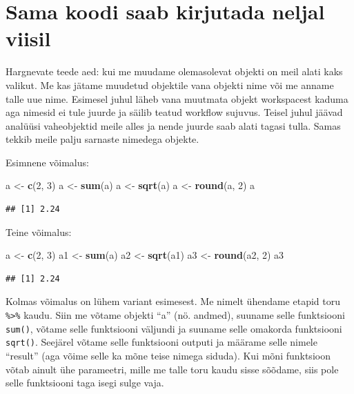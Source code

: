 \documentclass[]{book}
\newenvironment{Shaded}{\begin{snugshade}}{\end{snugshade}}
\newcommand{\KeywordTok}[1]{\textcolor[rgb]{0.13,0.29,0.53}{\textbf{#1}}}
\newcommand{\DecValTok}[1]{\textcolor[rgb]{0.00,0.00,0.81}{#1}}
\newcommand{\StringTok}[1]{\textcolor[rgb]{0.31,0.60,0.02}{#1}}
\newcommand{\NormalTok}[1]{#1}
\begin{document}
\section{Sama koodi saab kirjutada neljal
viisil}\label{sama-koodi-saab-kirjutada-neljal-viisil}

Hargnevate teede aed: kui me muudame olemasolevat objekti on meil alati
kaks valikut. Me kas jätame muudetud objektile vana objekti nime või me
anname talle uue nime. Esimesel juhul läheb vana muutmata objekt
workspacest kaduma aga nimesid ei tule juurde ja säilib teatud workflow
sujuvus. Teisel juhul jäävad analüüsi vaheobjektid meile alles ja nende
juurde saab alati tagasi tulla. Samas tekkib meile palju sarnaste
nimedega objekte.

Esimnene võimalus:

\begin{Shaded}
\begin{Highlighting}[]
\NormalTok{a <-}\StringTok{ }\KeywordTok{c}\NormalTok{(}\DecValTok{2}\NormalTok{, }\DecValTok{3}\NormalTok{)}
\NormalTok{a <-}\StringTok{ }\KeywordTok{sum}\NormalTok{(a)}
\NormalTok{a <-}\StringTok{ }\KeywordTok{sqrt}\NormalTok{(a)}
\NormalTok{a <-}\StringTok{ }\KeywordTok{round}\NormalTok{(a, }\DecValTok{2}\NormalTok{)}
\NormalTok{a}
\end{Highlighting}
\end{Shaded}

\begin{verbatim}
## [1] 2.24
\end{verbatim}

Teine võimalus:

\begin{Shaded}
\begin{Highlighting}[]
\NormalTok{a <-}\StringTok{ }\KeywordTok{c}\NormalTok{(}\DecValTok{2}\NormalTok{, }\DecValTok{3}\NormalTok{)}
\NormalTok{a1 <-}\StringTok{ }\KeywordTok{sum}\NormalTok{(a)}
\NormalTok{a2 <-}\StringTok{ }\KeywordTok{sqrt}\NormalTok{(a1)}
\NormalTok{a3 <-}\StringTok{ }\KeywordTok{round}\NormalTok{(a2, }\DecValTok{2}\NormalTok{)}
\NormalTok{a3}
\end{Highlighting}
\end{Shaded}

\begin{verbatim}
## [1] 2.24
\end{verbatim}

Kolmas võimalus on lühem variant esimesest. Me nimelt ühendame etapid
toru \texttt{\%\textgreater{}\%} kaudu. Siin me võtame objekti ``a''
(nö. andmed), suuname selle funktsiooni \texttt{sum()}, võtame selle
funktsiooni väljundi ja suuname selle omakorda funktsiooni
\texttt{sqrt()}. Seejärel võtame selle funktsiooni outputi ja määrame
selle nimele ``result'' (aga võime selle ka mõne teise nimega siduda).
Kui mõni funktsioon võtab ainult ühe parameetri, mille me talle toru
kaudu sisse sõõdame, siis pole selle funktsiooni taga isegi sulge vaja.
\end{document}
